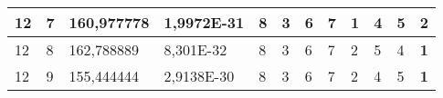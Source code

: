 \documentclass[conference]{IEEEtran}
\begin{document}
\begin{table*}[]
\begin{tabular}{|llll|llllllll|}
\multicolumn{1}{|l|}{12}                                                    & \multicolumn{1}{l|}{7}                                                        & \multicolumn{1}{l|}{160,977778}                                                   & 1,9972E-31                     & \multicolumn{1}{l|}{8}                                                  & \multicolumn{1}{l|}{3}                                                  & \multicolumn{1}{l|}{6}                                                  & \multicolumn{1}{l|}{7}                                                  & \multicolumn{1}{l|}{\textbf{1}}                                         & \multicolumn{1}{l|}{4}                                                  & \multicolumn{1}{l|}{5}                                                  & 2                          \\ \hline
\multicolumn{1}{|l|}{12}                                                    & \multicolumn{1}{l|}{8}                                                        & \multicolumn{1}{l|}{162,788889}                                                   & 8,301E-32                      & \multicolumn{1}{l|}{8}                                                  & \multicolumn{1}{l|}{3}                                                  & \multicolumn{1}{l|}{6}                                                  & \multicolumn{1}{l|}{7}                                                  & \multicolumn{1}{l|}{2}                                                  & \multicolumn{1}{l|}{5}                                                  & \multicolumn{1}{l|}{4}                                                  & \textbf{1}                 \\ \hline
\multicolumn{1}{|l|}{12}                                                    & \multicolumn{1}{l|}{9}                                                        & \multicolumn{1}{l|}{155,444444}                                                   & 2,9138E-30                     & \multicolumn{1}{l|}{8}                                                  & \multicolumn{1}{l|}{3}                                                  & \multicolumn{1}{l|}{6}                                                  & \multicolumn{1}{l|}{7}                                                  & \multicolumn{1}{l|}{2}                                                  & \multicolumn{1}{l|}{4}                                                  & \multicolumn{1}{l|}{5}                                                  & \textbf{1}                 \\ \hline

\end{tabular}
\end{table*}
\end{document}

